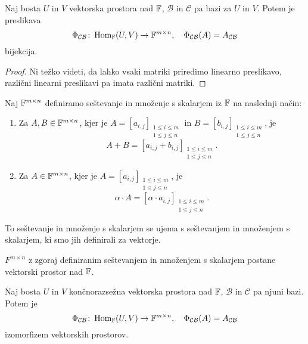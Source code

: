 \documentclass[12pt, a4paper]{article}
\begin{document}
\begin{trditev}
Naj bosta $U$ in $V$ vektorska prostora nad $\mathbb{F}$, $\mathcal{B}$ in $\mathcal{C}$ pa bazi za $U$ in $V$. Potem je preslikava
\[
\Phi_{\mathcal{CB}}\colon\operatorname{Hom}_{\mathbb{F}}(U,V)\to\mathbb{F}^{m\times n},\quad \Phi_{\mathcal{CB}}(A)=A_{\mathcal{CB}}
\]
bijekcija.
\end{trditev}

\begin{proof}
Ni težko videti, da lahko vsaki matriki priredimo linearno preslikavo, različni linearni preslikavi pa imata različni matriki.
\end{proof}

\begin{definicija}
Naj $\mathbb{F}^{m\times n}$ definiramo seštevanje in množenje s skalarjem iz $\mathbb{F}$ na naslednji način:

\begin{enumerate}[label=\roman*)]
\item Za $A,B\in\mathbb{F}^{m\times n}$, kjer je $A=[a_{i,j}]_{
\substack{
1\leq i\leq m \\
1\leq j\leq n}}$ in $B=[b_{i,j}]_{
\substack{
1\leq i\leq m \\
1\leq j\leq n}}$, je
\[
A+B=[a_{i,j}+b_{i,j}]_{
\substack{
1\leq i\leq m \\
1\leq j\leq n}}.
\]
\item Za $A\in\mathbb{F}^{m\times n}$, kjer je $A=[a_{i,j}]_{
\substack{
1\leq i\leq m \\
1\leq j\leq n}}$, je
\[
\alpha\cdot A=[\alpha\cdot a_{i,j}]_{
\substack{
1\leq i\leq m \\
1\leq j\leq n}}.
\]
\end{enumerate}
\end{definicija}

\begin{opomba}
To seštevanje in množenje s skalarjem se ujema s seštevanjem in množenjem s skalarjem, ki smo jih definirali za vektorje.
\end{opomba}

\begin{trditev}
$F^{m\times n}$ z zgoraj definiranim seštevanjem in množenjem s skalarjem postane vektorski prostor nad $\mathbb{F}$.
\end{trditev}

\obvs

\begin{izrek}
Naj bosta $U$ in $V$ končnorazsežna vektorska prostora nad $\mathbb{F}$, $\mathcal{B}$ in $\mathcal{C}$ pa njuni bazi. Potem je
\[
\Phi_{\mathcal{CB}}\colon\operatorname{Hom}_{\mathbb{F}}(U,V)\to\mathbb{F}^{m\times n},\quad \Phi_{\mathcal{CB}}(A)=A_{\mathcal{CB}}
\]
izomorfizem vektorskih prostorov.
\end{izrek}
\end{document}
